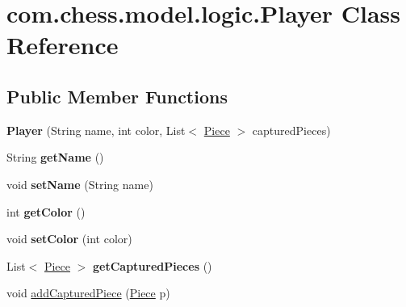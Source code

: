 \hypertarget{classcom_1_1chess_1_1model_1_1logic_1_1_player}{}\section{com.\+chess.\+model.\+logic.\+Player Class Reference}
\label{classcom_1_1chess_1_1model_1_1logic_1_1_player}
\subsection*{Public Member Functions}
\begin{DoxyCompactItemize}
\item 
\mbox{\label{classcom_1_1chess_1_1model_1_1logic_1_1_player_ad94450c053b1e7156dbccb44a93755f6}} 
{\bfseries Player} (String name, int color, List$<$ \mbox{\hyperlink{classcom_1_1chess_1_1model_1_1pieces_1_1_piece}{Piece}} $>$ captured\+Pieces)
\item 
\mbox{\label{classcom_1_1chess_1_1model_1_1logic_1_1_player_abc145a1c71ad8ef9420fc2b980a88da5}} 
String {\bfseries get\+Name} ()
\item 
\mbox{\label{classcom_1_1chess_1_1model_1_1logic_1_1_player_a754768349a558266fade70fae1ee7e22}} 
void {\bfseries set\+Name} (String name)
\item 
\mbox{\label{classcom_1_1chess_1_1model_1_1logic_1_1_player_a4e8dfb8c99b3b5cbe3c7772c412b4dc5}} 
int {\bfseries get\+Color} ()
\item 
\mbox{\label{classcom_1_1chess_1_1model_1_1logic_1_1_player_a5b47802371d2032169c743e4cf6b3e2e}} 
void {\bfseries set\+Color} (int color)
\item 
\mbox{\label{classcom_1_1chess_1_1model_1_1logic_1_1_player_a70b1bf0530af9804fbdcf7f71cb5d727}} 
List$<$ \mbox{\hyperlink{classcom_1_1chess_1_1model_1_1pieces_1_1_piece}{Piece}} $>$ {\bfseries get\+Captured\+Pieces} ()
\item 
void \mbox{\hyperlink{classcom_1_1chess_1_1model_1_1logic_1_1_player_a4a1d2d63ea4d89170ce7174acf8a9d26}{add\+Captured\+Piece}} (\mbox{\hyperlink{classcom_1_1chess_1_1model_1_1pieces_1_1_piece}{Piece}} p)
\end{DoxyCompactItemize}


